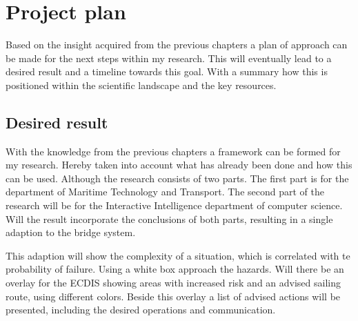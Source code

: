 \section{Project plan}
Based on the insight acquired from the previous chapters a plan of approach can be made for the next steps within my research. This will eventually lead to a desired result and a timeline towards this goal. With a summary how this is positioned within the scientific landscape and the key resources.

\subsection{Desired result}
With the knowledge from the previous chapters a framework can be formed for my research. Hereby taken into account what has already been done and how this can be used.
Although the research consists of two parts. The first part is for the department of Maritime Technology and Transport. The second part of the research will be for the Interactive Intelligence department of computer science. Will the result incorporate the conclusions of both parts, resulting in a single adaption to the bridge system.

This adaption will show the complexity of a situation, which is correlated with te probability of failure. Using a white box approach the hazards. Will there be an overlay for the ECDIS showing areas with increased risk and an advised sailing route, using different colors. Beside this overlay a list of advised actions will be presented, including the desired operations and communication.

